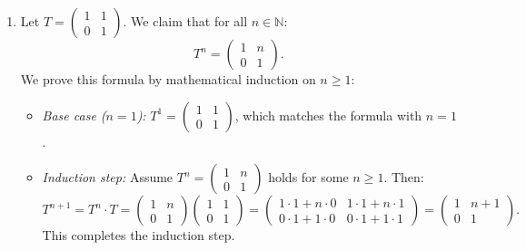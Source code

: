 \begin{exercisesolution}
\begin{enumerate}[label=\textbf{(\alph*)}]
    \item Let $T = \left(\begin{smallmatrix} 1 & 1 \\ 0 & 1 \end{smallmatrix}\right)$.
    We claim that for all $n \in \mathbb{N}$:
    \[
    T^n = \begin{pmatrix} 1 & n \\ 0 & 1 \end{pmatrix}.
    \]
    We prove this formula by mathematical induction on $n \ge 1$:
    \begin{itemize}
        \item \emph{Base case ($n = 1$):} $T^1 = \left(\begin{smallmatrix} 1 & 1 \\ 0 & 1 \end{smallmatrix}\right)$, which matches the formula with $n = 1$.
        \item \emph{Induction step:} Assume $T^n = \left(\begin{smallmatrix} 1 & n \\ 0 & 1 \end{smallmatrix}\right)$ holds for some $n \ge 1$. Then:
        \[
        T^{n+1} = T^n \cdot T = \begin{pmatrix} 1 & n \\ 0 & 1 \end{pmatrix} \begin{pmatrix} 1 & 1 \\ 0 & 1 \end{pmatrix} = \begin{pmatrix} 1\cdot 1 + n \cdot 0 & 1\cdot 1 + n \cdot 1 \\ 0 \cdot 1 + 1 \cdot 0 & 0 \cdot 1 + 1 \cdot 1 \end{pmatrix} = \begin{pmatrix} 1 & n+1 \\ 0 & 1 \end{pmatrix}.
        \]
        This completes the induction step. \qedhere
    \end{itemize}
\end{enumerate}
\end{exercisesolution}


